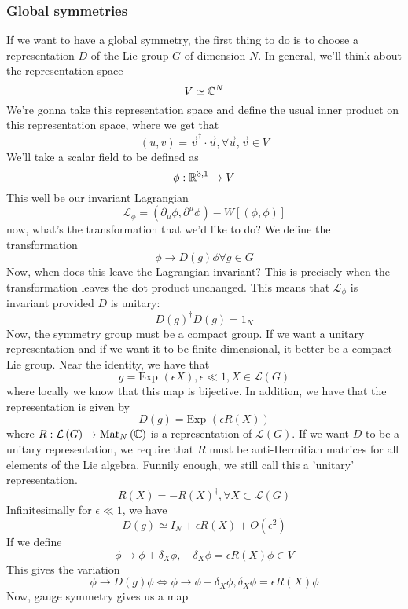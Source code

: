 \subsubsection{Global symmetries} 
If we want to have a global symmetry, 
the first thing to do is to choose a 
representation $ D $ of the Lie group $ G $
of dimension $ N $. In general, we'll 
think about the representation space 
\[
 V \simeq \mathbb{C} ^{ N } 
\] We're gonna take this 
representation space and 
define the usual inner product on this representation 
space, where we get that 
\[
 \left( u , v  \right)   = \vec{v}^{ \dagger } \cdot \vec{u}, \forall 
 \vec{u}, \vec{v} \in V 
\] We'll take a scalar field 
to be defined as 
\[
 \phi : \mathbb{R}^{ 3, 1 } \to V 
\] This well be our invariant Lagrangian
\[
	\mathcal{ L } _ \phi  = \left( \partial  _ \mu \phi , 
	\partial  ^ \mu \phi \right)   - W \left[ \left( \phi , \phi  \right)  \right] 
\] now, what's the transformation 
that we'd like to do? 
We define the transformation
\[
 \phi \to D ( g ) \phi \forall g \in G 
\] Now, when does this leave the Lagrangian invariant? 
This is precisely when the transformation leaves 
the dot product unchanged. 
This means that $ \mathcal{ L } _ \phi $ is invariant 
provided $ D $ is unitary: 
\[
	D ( g ) ^{ \dagger } D ( g )  = 1 _ N 
\] Now, the symmetry group must be a compact group. 
If we want a unitary representation and if 
we want it to be finite dimensional, it better 
be a compact Lie group. 
Near the identity, we have that 
\[
	g  = \text{Exp } \left( \epsilon X  \right)  , \epsilon \ll 1, 
	X \in \mathcal{ L } \left( G  \right) 
\] where locally we know that this map is bijective. 
In addition, we have that 
the representation is given by 
\[
	D ( g ) = \text{Exp }\left( \epsilon  R( X )  \right) 
\] where $ R : \mathcal{ L } \left( G  \right)  \to \text{Mat}_{N}\left( \mathbb{C} \right)  $ is a representation of $ \mathcal{ L } ( G) $. 
If we want $ D $ to be a unitary representation, 
we require that $ R $ must be anti-Hermitian 
matrices for all elements of the Lie algebra. 
Funnily enough, we still call this a 'unitary' representation. 
\[
	R ( X )  = - R ( X ) ^{ \dagger  }, \forall X \subset \mathcal{ L } \left( G  \right) 
\] Infinitesimally for $ \epsilon \ll 1 $, we have 
\[
 D ( g ) \simeq I _ N + \epsilon  R( X ) + O ( \epsilon ^ 2 ) 
\] If we define 
\[
 \phi \to \phi + \delta _ X \phi, \quad \delta _ X \phi = \epsilon R ( X ) \phi \in V 
\] This gives the variation
\[
 \phi \to D ( g ) \phi \iff \phi \to \phi + \delta _ X \phi, 
 \delta  _ X \phi = \epsilon  R( X ) \phi 
\] Now, gauge symmetry gives us a map 
